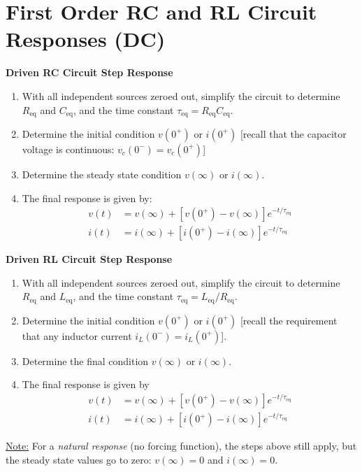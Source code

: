 \documentclass[12pt]{article}
\begin{document}
\section*{First Order RC and RL Circuit Responses (DC)}
\textbf{Driven RC Circuit Step Response}
\begin{enumerate}
    \item With all independent sources zeroed out, simplify the circuit to determine $R_{\text{eq}}$ and $C_{\text{eq}}$, and the time constant $\tau_{\text{eq}} = R_{\text{eq}} C_{\text{eq}}$.
    \item Determine the initial condition $v(0^+)$ or $i(0^+)$ [recall that the capacitor voltage is continuous: $v_c(0^-) = v_c(0^+)$]
    \item Determine the steady state condition $v(\infty)$ or $i(\infty)$.
    \item The final response is given by:
  \[\boxed{\begin{aligned}
    v(t) &= v(\infty) + [v(0^+) - v(\infty)] e^{-t/\tau_{\text{eq}}} \\
    i(t) &= i(\infty) + [i(0^+) - i(\infty)] e^{-t/\tau_{\text{eq}}}
    \end{aligned}}\]
\end{enumerate}
\textbf{Driven RL Circuit Step Response}
\begin{enumerate}
    \item With all independent sources zeroed out, simplify the circuit to determine $R_{\text{eq}}$ and $L_{\text{eq}}$, and the time constant $\tau_{\text{eq}} = L_{\text{eq}}/R_{\text{eq}}$.
    \item Determine the initial condition $v(0^+)$ or $i(0^+)$ [recall the requirement that any inductor current $i_L(0^-) = i_L(0^+)$].
    \item Determine the final condition $v(\infty)$ or $i(\infty)$.
    \item The final response is given by
     \[\boxed{\begin{aligned}
    v(t) &= v(\infty) + [v(0^+) - v(\infty)] e^{-t/\tau_{\text{eq}}} \\
    i(t) &= i(\infty) + [i(0^+) - i(\infty)] e^{-t/\tau_{\text{eq}}}
    \end{aligned}}\]
\end{enumerate}
\underline{Note:} For a \textit{natural response} (no forcing function), the steps above still apply, but the steady state values go to zero: $v(\infty) = 0$ and $i(\infty) = 0$.
\end{document}
